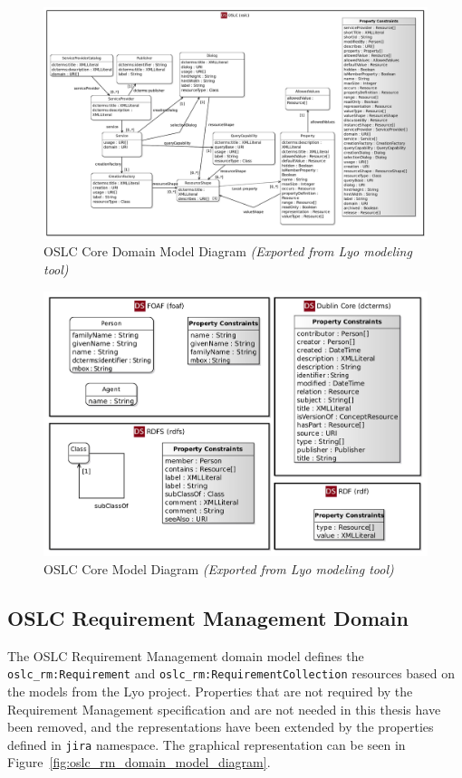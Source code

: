 \begin{figure}[H]
  \centering
  \begin{sideways}
    \includegraphics[width=1.45\linewidth]{figures/OSLC_Core_Domain.jpg}
  \end{sideways}

  \caption{OSLC Core Domain Model Diagram \emph{(Exported from Lyo modeling tool)}}
  \label{fig:oslc_core_domain_model_diagram} 
\end{figure}

\begin{figure}[h]
  \centering
  \includegraphics[width= .9\linewidth]{figures/Core_Domain.jpg}
  \caption{OSLC Core Model Diagram \emph{(Exported from Lyo modeling tool)}}
  \label{fig:oslc_core_model_diagram}
\end{figure}

\subsection*{OSLC Requirement Management Domain}
The OSLC Requirement Management domain model defines the \texttt{oslc\_rm:Requirement} and \texttt{oslc\_rm:RequirementCollection} resources based on the models from the Lyo project. Properties that are not required by the Requirement Management specification and are not needed in this thesis have been removed, and the representations have been extended by the properties defined in \texttt{jira} namespace. The graphical representation can be seen in Figure \ref{fig:oslc_rm_domain_model_diagram}.


